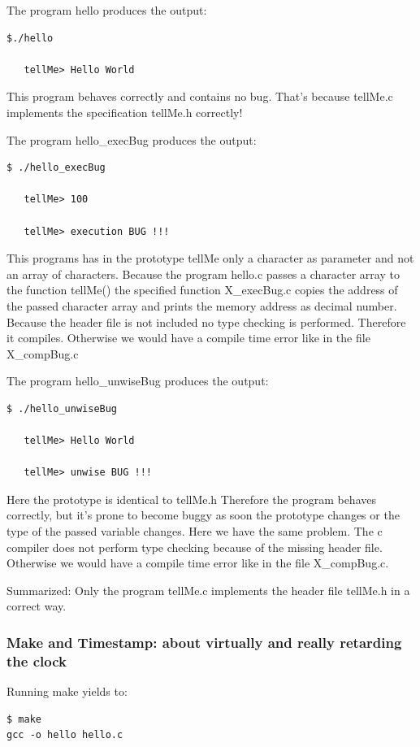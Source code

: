 \documentclass[12pt]{article}
\begin{document}
The program hello produces the output:
\begin{lstlisting}
$./hello

   tellMe> Hello World
\end{lstlisting}

This program behaves correctly and contains no bug. That's because tellMe.c implements the specification tellMe.h correctly!


The program hello\_execBug produces the output:
\begin{lstlisting}
$ ./hello_execBug 

   tellMe> 100

   tellMe> execution BUG !!!
\end{lstlisting}
This programs has in the prototype tellMe only a character as parameter and not an array of characters. Because the program hello.c passes a character array to the function tellMe() the specified function X\_execBug.c copies the address of the passed character array and prints the memory address as decimal number.
Because the header file is not included no type checking is performed. Therefore it compiles.
Otherwise we would have a compile time error like in the file X\_compBug.c


The program hello\_unwiseBug produces the output:
\begin{lstlisting}
$ ./hello_unwiseBug 

   tellMe> Hello World

   tellMe> unwise BUG !!!
\end{lstlisting}

Here the prototype is identical to tellMe.h Therefore the program behaves correctly, but it's prone to become buggy as soon the prototype changes or the type of the passed variable changes.
Here we have the same problem. The c compiler does not perform type checking because of the missing header file. Otherwise we would have a compile time error like in the file X\_compBug.c.

Summarized: Only the program tellMe.c implements the header file tellMe.h in a correct way.


\subsubsection*{Make and Timestamp: about virtually and really retarding the clock}
Running make yields to:
\begin{lstlisting}
$ make
gcc -o hello hello.c
\end{lstlisting}
\end{document}

